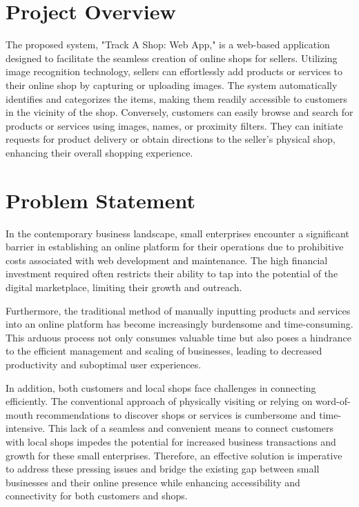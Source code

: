 \vspace{0.5cm}
\section{Project Overview}
The proposed system, "Track A Shop: Web App," is a web-based application designed to facilitate the seamless creation of online shops for sellers. Utilizing image recognition technology, sellers can effortlessly add products or services to their online shop by capturing or uploading images. The system automatically identifies and categorizes the items, making them readily accessible to customers in the vicinity of the shop. Conversely, customers can easily browse and search for products or services using images, names, or proximity filters. They can initiate requests for product delivery or obtain directions to the seller's physical shop, enhancing their overall shopping experience.

\vspace{0.5cm}
\section{Problem Statement}
In the contemporary business landscape, small enterprises encounter a significant barrier in establishing an online platform for their operations due to prohibitive costs associated with web development and maintenance. The high financial investment required often restricts their ability to tap into the potential of the digital marketplace, limiting their growth and outreach.

Furthermore, the traditional method of manually inputting products and services into an online platform has become increasingly burdensome and time-consuming. This arduous process not only consumes valuable time but also poses a hindrance to the efficient management and scaling of businesses, leading to decreased productivity and suboptimal user experiences.

In addition, both customers and local shops face challenges in connecting efficiently. The conventional approach of physically visiting or relying on word-of-mouth recommendations to discover shops or services is cumbersome and time-intensive. This lack of a seamless and convenient means to connect customers with local shops impedes the potential for increased business transactions and growth for these small enterprises. Therefore, an effective solution is imperative to address these pressing issues and bridge the existing gap between small businesses and their online presence while enhancing accessibility and connectivity for both customers and shops.

